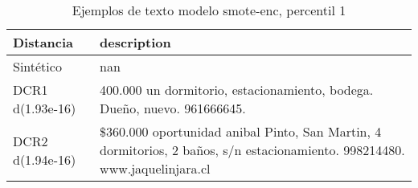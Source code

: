 \begin{table}[H]
\centering
\fontsize{10}{14}\selectfont
\caption{Ejemplos de texto modelo smote-enc, percentil 1}
\label{table-example-economicos-b-1-smote-enc-1p-text}
\begin{tabular}{|l|m{35em}|}
\hline
\rowcolor[gray]{0.8}
Distancia & description \\
\hline Sintético & nan \\
\hline DCR1 d(1.93e-16) & 400.000 un dormitorio, estacionamiento, bodega. Due\~no, nuevo. 961666645. \\
\hline DCR2 d(1.94e-16) & \$360.000 oportunidad anibal Pinto, San Martin, 4 dormitorios, 2 ba\~nos, s/n estacionamiento. 998214480. www.jaquelinjara.cl \\
\hline
\end{tabular}
\end{table}
